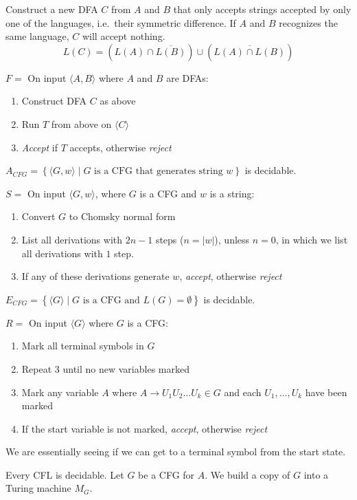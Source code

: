 \documentclass[12 pt]{article}
\begin{document}
Construct a new DFA $C$ from $A$ and $B$ that only accepts strings
accepted by only one of the languages, i.e.\ their symmetric
difference. If $A$ and $B$ recognizes the same language, $C$ will
accept nothing. $$L(C) = (L(A) \cap \overline{L(B)}) \cup
(\overline{L(A) \cap L(B)})$$

$F = $ On input $\langle A,B \rangle$ where $A$ and $B$ are DFAs:
\begin{enumerate}
\item Construct DFA $C$ as above
\item Run $T$ from above on $\langle C \rangle$
\item \textit{Accept} if $T$ accepts, otherwise \textit{reject}
\end{enumerate}
$A_{CFG} = \left\{\langle G,w \rangle \mid G \text{ is a CFG that
    generates string } w\right\}$ is decidable.

$S =$ On input $\langle G,w \rangle$, where $G$ is a CFG and $w$ is a
string:
\begin{enumerate}
\item Convert $G$ to Chomsky normal form
\item List all derivations with $2n-1$ steps ($n = |w|$), unless $n =
  0$, in which we list all derivations with $1$ step.
\item If any of these derivations generate $w$, \textit{accept},
  otherwise \textit{reject}
\end{enumerate}
$E_{CFG} = \left\{\langle G \rangle \mid G \text{ is a CFG and } L(G)
  = \emptyset\right\}$ is decidable.

$R = $ On input $\langle G \rangle$ where $G$ is a CFG:
\begin{enumerate}
\item Mark all terminal symbols in $G$
\item Repeat 3 until no new variables marked
\item Mark any variable $A$ where $A \to U_1U_2 \ldots U_k \in G$ and
  each $U_1, \ldots, U_k$ have been marked
\item If the start variable is not marked, \textit{accept}, otherwise \textit{reject}
\end{enumerate}
We are essentially seeing if we can get to a terminal symbol from the
start state.

Every CFL is decidable. Let $G$ be a CFG for $A$. We build a copy of
$G$ into a Turing machine $M_G$.
\end{document}
